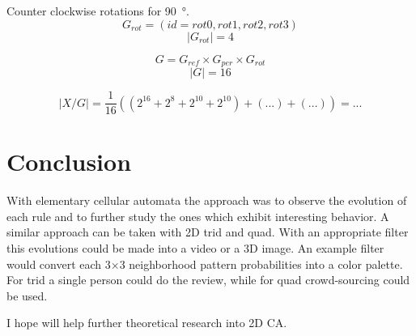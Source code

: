 \documentclass{ijuc}
\begin{document}
Counter clockwise rotations for \SI{90}{\degree}.
\[ G_{rot} = (id=rot0, rot1, rot2, rot3) \]
\[ \vert G_{rot} \vert = 4 \]

\[ G = G_{ref} \times G_{per} \times G_{rot} \]
\[ \vert G \vert = 16 \]

\[ |X/G| = \frac{1}{16} \left( (2^{16} + 2^8 + 2^{10} + 2^{10}) + (...) + (...) \right) = ... \]

\section{Conclusion}

With elementary cellular automata the approach was to observe the evolution of
each rule and to further study the ones which exhibit interesting behavior.
A similar approach can be taken with 2D trid and quad. With an appropriate filter
this evolutions could be made into a video or a 3D image. An example filter would
convert each 3×3 neighborhood pattern probabilities into a color palette. For trid
a single person could do the review, while for quad crowd-sourcing could be used.

I hope will help further theoretical research into 2D CA.



\appendix 
\end{document}
